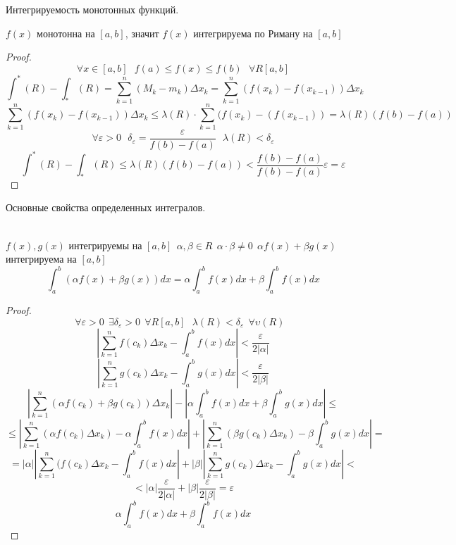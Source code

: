 \begin{title}[\Large]
  Интегрируемость монотонных функций.
\end{title}

\begin{theorem}
  $f(x)$ монотонна на $[a,b]$, значит $f(x)$ интегрируема по Риману на $[a,b]$
\end{theorem}

\begin{proof}
  \[\forall x \in [a,b] ~~~ f(a) \le f(x) \le f(b) ~~~ \forall R[a,b]\]
  \[
    \int^* (R) - \int_* (R) = \sum_{k = 1}^{n} (M_k - m_k) \Delta x_k
    = \sum_{k = 1}^{n} (f(x_k) - f(x_{k-1})) \Delta x_k
  \]
  \[
    \sum_{k = 1}^{n} (f(x_k) - f(x_{k-1})) \Delta x_k \le \lambda(R) \cdot
    \sum_{k = 1}^{n} (f(x_k) - (f(x_{k - 1})) = \lambda (R) (f(b) - f(a))
  \]
  \[
    \forall \varepsilon > 0 ~~~ \delta_\varepsilon = \frac{\varepsilon}{f(b) -
    f(a)} ~~~ \lambda (R) < \delta_\varepsilon
  \]
  \[
  \int^* (R) - \int_* (R) \le \lambda (R) (f(b) - f(a)) <
  \frac{f(b)-f(a)}{f(b)-f(a)} \varepsilon = \varepsilon
  \]
\end{proof}
\begin{title}[\Large]
    Основные свойства определенных интегралов.
\end{title}

\\
$f(x), g(x)$ интегрируемы на $[a,b] ~~ \alpha , \beta \in R ~~
\alpha \cdot \beta \not= 0 ~~ \alpha f(x) + \beta g(x)$ интегрируема на $[a,b]$
\[
    \int_a^b (\alpha f(x) + \beta g(x))dx = \alpha \int_a^b f(x)dx
    + \beta \int_a^b f(x)dx
\]

\begin{proof}
    \[
        \forall\varepsilon>0 ~~ \exists\delta_{\varepsilon}>0 ~~ \forall R[a,b]
        ~~~ \lambda(R) < \delta_{\varepsilon} ~~ \forall\upsilon(R) ~~~
    \]
    \[
        \left| \sum_{k=1}^{n} f(c_k)\Delta x_k -
        \int_a^b f(x)dx \right| < \frac{\varepsilon}{2|\alpha|}
    \]
    \[
        \left| \sum_{k=1}^{n} g(c_k)\Delta x_k -
        \int_a^b g(x)dx \right| < \frac{\varepsilon}{2|\beta|}
    \]
    \[
        \left| \sum_{k=1}^{n} (\alpha f(c_k) + \beta g(c_k))\Delta x_k \right| -
        \left| \alpha \int_a^b f(x)dx + \beta \int_a^b g(x)dx \right| \le
    \]
    \[
      \le \left| \sum_{k=1}^{n} (\alpha f(c_k) \Delta x_k) -
      \alpha \int_a^b f(x)dx \right| + \left| \sum_{k=1}^{n} (\beta g(c_k)
      \Delta x_k) - \beta \int_a^b g(x)dx \right| =
    \]
    \[
      = |\alpha| \left| \sum_{k=1}^{n} (f(c_k) \Delta x_k -
      \int_a^b f(x)dx \right| + |\beta| \left| \sum_{k=1}^{n} g(c_k)
      \Delta x_k - \int_a^b g(x)dx \right| <
    \]
    \[
        < |\alpha| \frac{\varepsilon}{2|\alpha|} + |\beta|
        \frac{\varepsilon}{2|\beta|} = \varepsilon
    \]
    \[\alpha \int_a^b f(x)dx + \beta \int_a^b f(x)dx\]
\end{proof}

